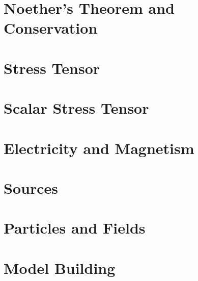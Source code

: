 \section{Noether's Theorem and Conservation}\label{sec:JFrank_CFT_3.3}

\section{Stress Tensor}\label{sec:JFrank_CFT_3.4}

\section{Scalar Stress Tensor}\label{sec:JFrank_CFT_3.5}

\section{Electricity and Magnetism}\label{sec:JFrank_CFT_3.6}

\section{Sources}\label{sec:JFrank_CFT_3.7}

\section{Particles and Fields}\label{sec:JFrank_CFT_3.8}

\section{Model Building}\label{sec:JFrank_CFT_3.9}